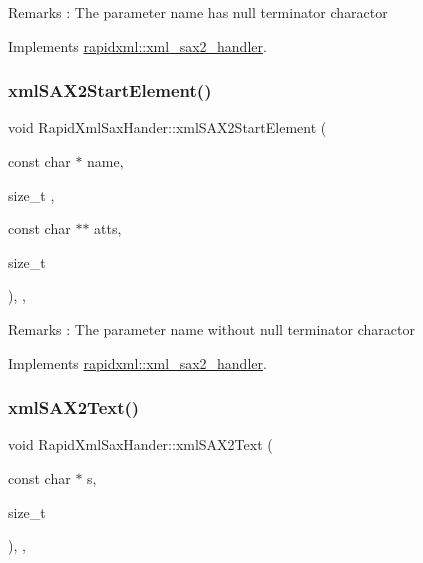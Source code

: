 \begin{DoxyRemark}{Remarks}
\+: The parameter \textquotesingle{}name\textquotesingle{} has null terminator charactor 
\end{DoxyRemark}


Implements \hyperlink{classrapidxml_1_1xml__sax2__handler_a330a65a04e36574c97f458e77ed42771}{rapidxml\+::xml\+\_\+sax2\+\_\+handler}.

\mbox{\label{classRapidXmlSaxHander_a71e12a4c8a2c5f03b621788d3aeb884c}} 
\subsubsection{\texorpdfstring{xml\+S\+A\+X2\+Start\+Element()}{xmlSAX2StartElement()}}
{\footnotesize\ttfamily void Rapid\+Xml\+Sax\+Hander\+::xml\+S\+A\+X2\+Start\+Element (\begin{DoxyParamCaption}\item[{const char $\ast$}]{name,  }\item[{size\+\_\+t}]{,  }\item[{const char $\ast$$\ast$}]{atts,  }\item[{size\+\_\+t}]{ }\end{DoxyParamCaption})\hspace{0.3cm}{\ttfamily [inline]}, {\ttfamily [override]}, {\ttfamily [virtual]}}

\begin{DoxyRemark}{Remarks}
\+: The parameter \textquotesingle{}name\textquotesingle{} without null terminator charactor 
\end{DoxyRemark}


Implements \hyperlink{classrapidxml_1_1xml__sax2__handler_afd825cb872693671d8dd4a6cd44f73c6}{rapidxml\+::xml\+\_\+sax2\+\_\+handler}.

\mbox{\label{classRapidXmlSaxHander_af6288a590b26853714182f507c10a66b}} 
\subsubsection{\texorpdfstring{xml\+S\+A\+X2\+Text()}{xmlSAX2Text()}}
{\footnotesize\ttfamily void Rapid\+Xml\+Sax\+Hander\+::xml\+S\+A\+X2\+Text (\begin{DoxyParamCaption}\item[{const char $\ast$}]{s,  }\item[{size\+\_\+t}]{ }\end{DoxyParamCaption})\hspace{0.3cm}{\ttfamily [inline]}, {\ttfamily [override]}, {\ttfamily [virtual]}}

